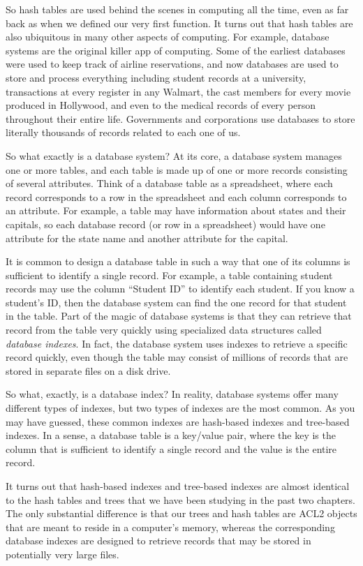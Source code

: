So hash tables are used behind the scenes in computing all the time,
even as far back as when we defined our very first function. It turns
out that hash tables are also ubiquitous in many other aspects of
computing. For example, database systems are the original killer app of 
computing. Some of the earliest databases were used to keep track
of airline reservations, and now databases are used to store and
process everything including student records at a university,
transactions at every register in any Walmart, the 
cast members for every movie produced in Hollywood, and even to 
the medical records of every person throughout their entire life.
Governments and corporations use databases to store literally 
thousands of records related to each one of us.

So what exactly is a database system? At its core, a database system
manages one or more tables, and each table is made up of one or more
records consisting of several attributes. Think of a database table as a
spreadsheet, where each record corresponds to a row in the spreadsheet
and each column corresponds to an attribute. For example, a table
may have information about states and their capitals, so each database
record (or row in a spreadsheet) would have one attribute for the 
state name and another attribute for the capital.

It is common to design a database table in such a way that one of its
columns is sufficient to identify a single record. For example, a
table containing student records may use the column ``Student ID''
to identify each student. If you know a student's ID, then the 
database system can find the one record for that student in the 
table. Part of the magic of database systems is that they can retrieve
that record from the table very quickly using specialized data
structures called \emph{database indexes}. In fact, the database
system uses indexes to retrieve a specific record quickly, even 
though the table may consist of millions of records that are stored 
in separate files on a disk drive.

So what, exactly, is a database index? In reality, database systems
offer many different types of indexes, but two types of indexes are
the most common. As you may have guessed, these common indexes
are hash-based indexes and tree-based indexes. In a sense, a database
table is a key/value pair, where the key is the column that is
sufficient to identify a single record and the value is the entire
record.

It turns out that hash-based indexes and tree-based indexes are
almost identical to the hash tables and trees that we have been
studying in the past two chapters. The only substantial difference
is that our trees and hash tables are ACL2 objects that are meant
to reside in a computer's memory, whereas the corresponding database
indexes are designed to retrieve records that may be stored in
potentially very large files.

